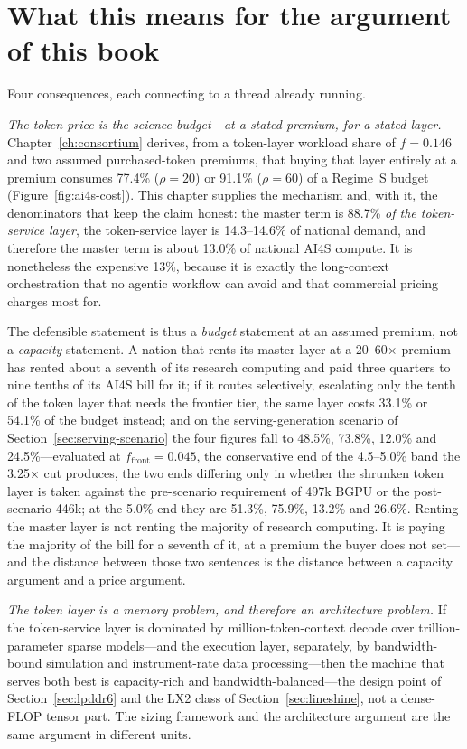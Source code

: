 \section{What this means for the argument of this book}

Four consequences, each connecting to a thread already running.

\emph{The token price is the science budget---at a stated premium, for a stated layer.} Chapter~\ref{ch:consortium} derives, from a token-layer workload share of $f = 0.146$ and two assumed purchased-token premiums, that buying that layer entirely at a premium consumes 77.4\% ($\rho = 20$) or 91.1\% ($\rho = 60$) of a Regime~S budget (Figure~\ref{fig:ai4s-cost}). This chapter supplies the mechanism and, with it, the denominators that keep the claim honest: the master term is 88.7\% \emph{of the token-service layer}, the token-service layer is 14.3--14.6\% of national demand, and therefore the master term is about 13.0\% of national AI4S compute. It is nonetheless the expensive 13\%, because it is exactly the long-context orchestration that no agentic workflow can avoid and that commercial pricing charges most for.

The defensible statement is thus a \emph{budget} statement at an assumed premium, not a \emph{capacity} statement. A nation that rents its master layer at a 20--60$\times$ premium has rented about a seventh of its research computing and paid three quarters to nine tenths of its AI4S bill for it; if it routes selectively, escalating only the tenth of the token layer that needs the frontier tier, the same layer costs 33.1\% or 54.1\% of the budget instead; and on the serving-generation scenario of Section~\ref{sec:serving-scenario} the four figures fall to 48.5\%, 73.8\%, 12.0\% and 24.5\%---evaluated at $f_{\mathrm{front}} = 0.045$, the conservative end of the 4.5--5.0\% band the 3.25$\times$ cut produces, the two ends differing only in whether the shrunken token layer is taken against the pre-scenario requirement of 497k BGPU or the post-scenario 446k; at the 5.0\% end they are 51.3\%, 75.9\%, 13.2\% and 26.6\%. Renting the master layer is not renting the majority of research computing. It is paying the majority of the bill for a seventh of it, at a premium the buyer does not set---and the distance between those two sentences is the distance between a capacity argument and a price argument.

\emph{The token layer is a memory problem, and therefore an architecture problem.} If the token-service layer is dominated by million-token-context decode over trillion-parameter sparse models---and the execution layer, separately, by bandwidth-bound simulation and instrument-rate data processing---then the machine that serves both best is capacity-rich and bandwidth-balanced---the design point of Section~\ref{sec:lpddr6} and the LX2 class of Section~\ref{sec:lineshine}, not a dense-FLOP tensor part. The sizing framework and the architecture argument are the same argument in different units.


